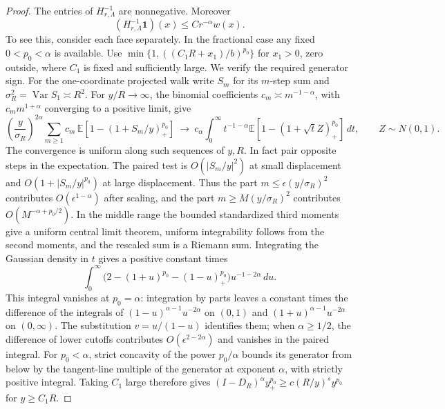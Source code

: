 \documentclass[11pt]{article}
\theoremstyle{definition}
\begin{document}
\begin{proof}
The entries of
\(H_{r,\Lambda}^{-1}\) are nonnegative. Moreover
\begin{equation}
 (H_{r,\Lambda}^{-1}\mathbf1)(x)\le C r^{-\alpha}w(x).
\end{equation}
To see this, consider each face separately. In the fractional
case any fixed \(0<p_0<\alpha\) is available. Use
\(\min\{1,((C_1 R+x_1)/b)^{p_0}\}\) for \(x_1>0\),
zero outside, where \(C_1\) is fixed and sufficiently large.
We verify the required generator sign. For the one-coordinate
projected walk write \(S_m\) for its \(m\)-step sum and
\(\sigma_R^2=\operatorname{Var}S_1\asymp R^2\).
For \(y/R\to\infty\), the binomial coefficients \(c_m\asymp
m^{-1-\alpha}\), with \(c_m m^{1+\alpha}\) converging to a
positive limit, give
\begin{equation}
 \left(\frac y{\sigma_R}\right)^{2\alpha}
 \sum_{m\ge1} c_m\,\mathbb E[1-(1+S_m/y)_+^{p_0}]
 \ \longrightarrow\
 c_\alpha\int_0^\infty t^{-1-\alpha}
                \mathbb E[1-(1+\sqrt t Z)_+^{p_0}]\,dt,
 \qquad Z\sim N(0,1).
\end{equation}
The convergence is uniform along such sequences of \(y,R\).
In fact pair opposite steps in the expectation. The paired test
is \(O(|S_m/y|^2)\) at small displacement and
\(O(1+|S_m/y|^{p_0})\) at large displacement. Thus the part
\(m\le\epsilon(y/\sigma_R)^2\) contributes \(O(\epsilon^{1-\alpha})\)
after scaling, and the part \(m\ge M(y/\sigma_R)^2\) contributes
\(O(M^{-\alpha+p_0/2})\). In the middle range the bounded
standardized third moments give a uniform central limit theorem,
uniform integrability follows from the second moments, and the
rescaled sum is a Riemann sum. Integrating the Gaussian density
in \(t\) gives a positive constant times
\begin{equation}
 \int_0^\infty
      \bigl(2-(1+u)^{p_0}-(1-u)_+^{p_0}\bigr)u^{-1-2\alpha}\,du .
\end{equation}
This integral vanishes at \(p_0=\alpha\): integration by
parts leaves a constant times the difference of the integrals
of \((1-u)^{\alpha-1}u^{-2\alpha}\) on \((0,1)\) and
\((1+u)^{\alpha-1}u^{-2\alpha}\) on \((0,\infty)\).
The substitution \(v=u/(1-u)\) identifies them; when
\(\alpha\ge1/2\), the difference of lower cutoffs contributes
\(O(\epsilon^{2-2\alpha})\) and vanishes in the paired integral.
For \(p_0<\alpha\), strict concavity of the power \(p_0/\alpha\)
bounds its generator from below by the tangent-line multiple
of the generator at exponent \(\alpha\), with strictly
positive integral. Taking \(C_1\) large therefore gives
\((I-D_R)^\alpha y_+^{p_0}\ge c(R/y)^s y^{p_0}\) for \(y\ge C_1 R\).

\end{proof}
\end{document}
